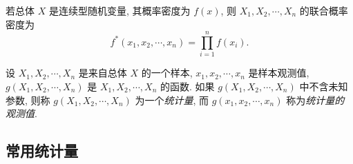 若总体 $ X $ 是连续型随机变量, 其概率密度为 $ f(x) $, 则 $ X_{1}, X_{2}, \cdots, X_{n} $ 的联合概率密度为 $$ f^{*}\left(x_{1}, x_{2}, \cdots, x_{n}\right)=\prod_{i=1}^{n} f\left(x_{i}\right).$$

\begin{definition}[统计量与其观测值]
    设 $ X_{1}, X_{2}, \cdots, X_{n} $ 是来自总体 $ X $ 的一个样本, $ x_{1}, x_{2}, \cdots, x_{n} $ 是样本观测值, $ g\left(X_{1}, X_{2}, \cdots, X_{n}\right) $ 是 $ X_{1}, X_{2}, \cdots, X_{n} $ 的函数. 如果 $ g\left(X_{1}, X_{2}, \cdots, X_{n}\right) $ 中不含未知参数, 则称 $ g\left(X_{1}, X_{2}, \cdots, X_{n}\right) $ 为一个\textit{统计量}, 而 $ g\left(x_{1}, x_{2}, \cdots, x_{n}\right) $ 称为\textit{统计量的观测值}.
\end{definition}

\subsection{常用统计量}

